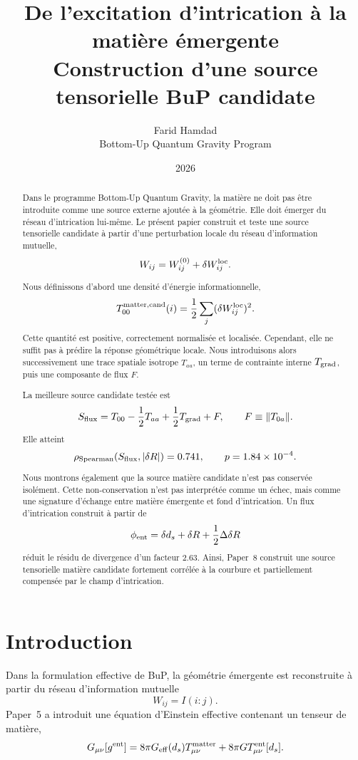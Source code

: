 \documentclass[11pt,a4paper]{article}
\title{
\textbf{De l'excitation d'intrication à la matière émergente}\\[0.4em]
\large Construction d'une source tensorielle BuP candidate
}
\author{
Farid Hamdad\\
\small Bottom-Up Quantum Gravity Program
}
\date{2026}
\begin{document}
\maketitle

\begin{abstract}

Dans le programme Bottom-Up Quantum Gravity, la matière ne doit pas être
introduite comme une source externe ajoutée à la géométrie. Elle doit émerger
du réseau d'intrication lui-même. Le présent papier construit et teste une
source tensorielle candidate à partir d'une perturbation locale du réseau
d'information mutuelle,
\[
W_{ij}=W_{ij}^{(0)}+\delta W_{ij}^{\rm loc}.
\]

Nous définissons d'abord une densité d'énergie informationnelle,
\[
T_{00}^{\rm matter,cand}(i)
=
\frac12
\sum_j(\delta W_{ij}^{\rm loc})^2.
\]
Cette quantité est positive, correctement normalisée et localisée. Cependant,
elle ne suffit pas à prédire la réponse géométrique locale. Nous introduisons
alors successivement une trace spatiale isotrope \(T_{aa}\), un terme de
contrainte interne \(T_{\rm grad}\), puis une composante de flux \(F\).

La meilleure source candidate testée est
\[
S_{\rm flux}
=
T_{00}
-\frac12 T_{aa}
+
\frac12 T_{\rm grad}
+
F,
\qquad
F\equiv\|T_{0a}\|.
\]
Elle atteint
\[
\rho_{\rm Spearman}(S_{\rm flux},|\delta R|)
=
0.741,
\qquad
p=1.84\times10^{-4}.
\]

Nous montrons également que la source matière candidate n'est pas conservée
isolément. Cette non-conservation n'est pas interprétée comme un échec, mais
comme une signature d'échange entre matière émergente et fond d'intrication.
Un flux d'intrication construit à partir de
\[
\phi_{\rm ent}
=
\delta d_s+\delta R+\frac12\Delta\delta R
\]
réduit le résidu de divergence d'un facteur \(2.63\). Ainsi, Paper~8 construit
une source tensorielle matière candidate fortement corrélée à la courbure et
partiellement compensée par le champ d'intrication.

\end{abstract}

\tableofcontents

\section{Introduction}

Dans la formulation effective de BuP, la géométrie émergente est reconstruite à
partir du réseau d'information mutuelle
\[
W_{ij}=I(i:j).
\]
Paper~5 a introduit une équation d'Einstein effective contenant un tenseur de
matière,
\[
G_{\mu\nu}[g^{\rm ent}]
=
8\pi G_{\rm eff}(d_s)T_{\mu\nu}^{\rm matter}
+
8\pi G T_{\mu\nu}^{\rm ent}[d_s].
\]
\end{document}
